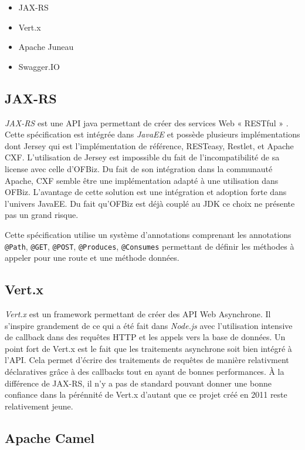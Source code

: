 \documentclass[a4paper, 11pt]{report}
\begin{document}
\begin{itemize}
\item JAX-RS
\item Vert.x
\item Apache Juneau
\item Swagger.IO
\end{itemize}

\subsection{JAX-RS}

\emph{JAX-RS} est une API java permettant de créer des services Web «
RESTful » \cite{pericas2013jax}. Cette spécification est intégrée dans
\emph{JavaEE} et possède plusieurs implémentations dont Jersey qui est
l'implémentation de référence, RESTeasy, Restlet, et Apache CXF.
L'utilisation de Jersey est impossible du fait de l'incompatibilité de
sa license avec celle d'OFBiz.  Du fait de son intégration dans la
communauté Apache, CXF semble être une implémentation adapté à une
utilisation dans OFBiz.  L'avantage de cette solution est une
intégration et adoption forte dans l'univers JavaEE.  Du fait qu'OFBiz
est déjà couplé au JDK ce choix ne présente pas un grand risque.

Cette spécification utilise un système d'annotations comprenant les
annotations \verb=@Path=, \verb=@GET=, \verb=@POST=, \verb=@Produces=,
\verb=@Consumes= permettant de définir les méthodes à appeler pour une
route et une méthode données.

\subsection{Vert.x}

\emph{Vert.x} est un framework permettant de créer des API Web
Asynchrone.  Il s'inspire grandement de ce qui a été fait dans
\emph{Node.js} avec l'utilisation intensive de callback dans des
requêtes HTTP et les appels vers la base de données. Un point fort de
Vert.x est le fait que les traitements asynchrone soit bien intégré à
l'API. Cela permet d'écrire des traitements de requêtes de manière
relativment déclaratives grâce à des callbacks tout en ayant de bonnes
performances.  À la différence de JAX-RS, il n'y a pas de standard
pouvant donner une bonne confiance dans la pérénnité de Vert.x
d'autant que ce projet créé en 2011 reste relativement jeune.

\subsection{Apache Camel}
\end{document}
